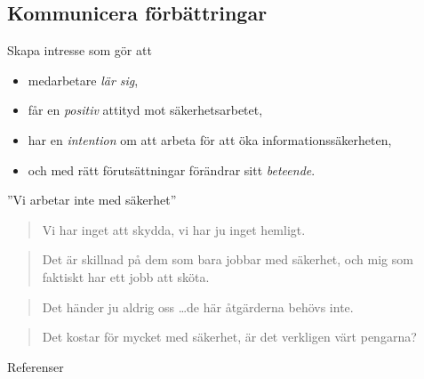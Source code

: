 \documentclass{beamer}
\begin{document}
\subsection{Kommunicera förbättringar}
\begin{frame}{\insertsubsectionhead}
  Skapa intresse som gör att
  \begin{itemize}
    \item medarbetare \emph{lär sig},
    \item får en \emph{positiv} attityd mot säkerhetsarbetet,
    \item har en \emph{intention} om att arbeta för att öka 
      informationssäkerheten,
    \item och med rätt förutsättningar förändrar sitt \emph{beteende}.
  \end{itemize}
\end{frame}
\begin{frame}{\insertsubsectionhead}{''Vi arbetar inte med säkerhet''}
  \begin{quote}
    Vi har inget att skydda, vi har ju inget hemligt.
  \end{quote}
  \begin{quote}
    Det är skillnad på dem som bara jobbar med säkerhet, och mig som faktiskt 
    har ett jobb att sköta.
  \end{quote}
  \begin{quote}
    Det händer ju aldrig oss \dots de här åtgärderna behövs inte.
  \end{quote}
  \begin{quote}
    Det kostar för mycket med säkerhet, är det verkligen värt pengarna?
  \end{quote}
\end{frame}




\begin{frame}[allowframebreaks]{Referenser}
	\small
  \printbibliography{}
\end{frame}
\end{document}
